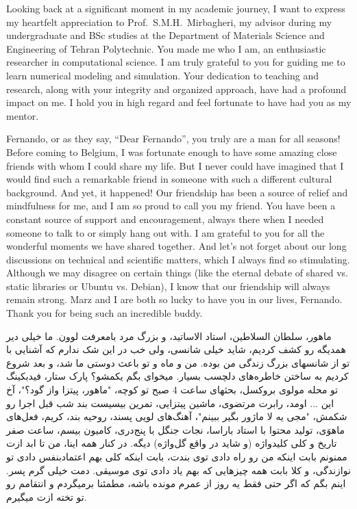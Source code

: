 Looking back at a significant moment in my academic journey, I want to express my heartfelt appreciation to Prof.~S.M.H.~Mirbagheri, my advisor during my undergraduate and BSc studies at the Department of Materials Science and Engineering of Tehran Polytechnic. You made me who I am, an enthusiastic researcher in computational science. I am truly grateful to you for guiding me to learn numerical modeling and simulation. Your dedication to teaching and research, along with your integrity and organized approach, have had a profound impact on me. I hold you in high regard and feel fortunate to have had you as my mentor.

\newpage

Fernando, or as they say, ``Dear Fernando'', you truly are a man for all seasons! Before coming to Belgium, I was fortunate enough to have some amazing close friends with whom I could share my life. But I never could have imagined that I would find such a remarkable friend in someone with such a different cultural background. And yet, it happened! Our friendship has been a source of relief and mindfulness for me, and I am so proud to call you my friend. You have been a constant source of support and encouragement, always there when I needed someone to talk to or simply hang out with. I am grateful to you for all the wonderful moments we have shared together. And let's not forget about our long discussions on technical and scientific matters, which I always find so stimulating. Although we may disagree on certain things (like the eternal debate of shared vs. static libraries or Ubuntu vs. Debian), I know that our friendship will always remain strong. Marz and I are both so lucky to have you in our lives, Fernando. Thank you for being such an incredible buddy.

\begin{flushright}
\foreignlanguage{persian}
{
ماهور، سلطان السلاطین، استاد الاساتید، و بزرگ مرد بامعرفت لوون. ما خیلی دیر همدیگه رو کشف کردیم، شاید خیلی شانسی، ولی خب در این شک ندارم که آشنایی با تو از شانسهای بزرگ زندگی من بوده. من و ماه و تو باعث دوستی ما شد، و بعد شروع کردیم به ساختن خاطره‌های دلچسب بسیار. میخوای بگم یکمشو؟ پارک ستار، فیدبکینگ تو محله مولوی بروکسل، بحثهای ساعت 4 صبح تو کوچه، "ماهور، پیتزا واز گود؟"، آخ این ... اومد، رابرت مرتضوی، ماشین پیتزایی، تمرین بیسیست بند شب قبل اجرا رو شکمش، "مجی یه لا ماژور بگیر ببینم"، آهنگ‌های لویی پسند، روحیه بند، کریم، فعل‌های ماهوَی، تولید محتوا با استاد باراسا، نجات جنگل با پنج‌دری، کامیون بیسم، ساعت صفر تاریخ و کلی کلیدواژه (و شاید در واقع گل‌واژه) دیگه. در کنار همه اینا، من تا ابد ازت ممنونم بابت اینکه من رو راه دادی توی بندت، بابت اینکه کلی بهم اعتمادبنفس دادی تو نوازندگی، و کلا بابت همه چیزهایی که بهم یاد دادی توی موسیقی. دمت خیلی گرم پسر. اینم بگم که اگر حتی فقط یه روز از عمرم مونده باشه، مطمئنا برمیگردم و انتقامم رو تو تخته ازت میگیرم.
}
\end{flushright}

